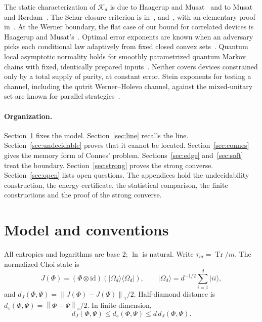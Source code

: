 \documentclass[11pt]{article}
\theoremstyle{definition}
\theoremstyle{remark}
\DeclareMathOperator{\Tr}{Tr}
\newcommand{\id}{\mathrm{id}}
\newcommand{\K}{\mathcal K}
\newcommand{\norm}[1]{\left\lVert#1\right\rVert}
\newcommand{\ket}[1]{\lvert#1\rangle}
\newcommand{\bra}[1]{\langle#1\rvert}
\begin{document}
The static characterization of $\K_d$ is due to Haagerup and Musat~\cite{HM2015} and to Musat and R\o rdam~\cite{MusatRordam21}. The Schur closure criterion is in~\cite[Proposition~2.8]{HM2011}, \cite[proof of Theorem~3.7]{HM2015} and~\cite[Proposition~3.9]{Musat}, with an elementary proof in~\cite{HarrisEtAl}. At the Werner boundary, the flat case of our bound for correlated devices is Haagerup and Musat's~\cite[Lemmas~5.4 and~5.5]{HM2015}. Optimal error exponents are known when an adversary picks each conditional law adaptively from fixed closed convex sets~\cite[Theorems~2 and~7]{BHLP}. Quantum local asymptotic normality holds for smoothly parametrized quantum Markov chains with fixed, identically prepared inputs~\cite{GutaKiukas,GirottiKiukasGuta}. Neither covers devices constrained only by a total supply of purity, at constant error. Stein exponents for testing a channel, including the qutrit Werner--Holevo channel, against the mixed-unitary set are known for parallel strategies~\cite{GhosalEtAl}.

\paragraph{Organization.}
Section~\ref{sec:model} fixes the model. Section~\ref{sec:line} recalls the line. Section~\ref{sec:undecidable} proves that it cannot be located. Section~\ref{sec:connes} gives the memory form of Connes' problem. Sections~\ref{sec:edge} and~\ref{sec:soft} treat the boundary. Section~\ref{sec:strong} proves the strong converse. Section~\ref{sec:open} lists open questions. The appendices hold the undecidability construction, the energy certificate, the statistical comparison, the finite constructions and the proof of the strong converse.


\section{Model and conventions}\label{sec:model}

All entropies and logarithms are base $2$; $\ln$ is natural. Write $\tau_m=\Tr/m$. The normalized Choi state is
\[
 J(\Phi)=(\Phi\otimes\id)(\ket{\Omega_d}\bra{\Omega_d}),\qquad
 \ket{\Omega_d}=d^{-1/2}\sum_{i=1}^d\ket{ii},
\]
and $d_J(\Phi,\Psi)=\norm{J(\Phi)-J(\Psi)}_1/2$. Half-diamond distance is $d_\diamond(\Phi,\Psi)=\norm{\Phi-\Psi}_\diamond/2$. In finite dimension,
\begin{equation}\label{eq:distances}
 d_J(\Phi,\Psi)\le d_\diamond(\Phi,\Psi)\le d\,d_J(\Phi,\Psi).
\end{equation}
\end{document}
